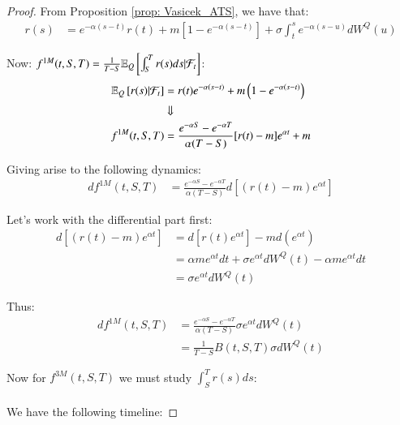 \begin{proof}

From Proposition \ref{prop: Vasicek_ATS}, we have that: 
\begin{align*}
r(s) &= e^{-\alpha(s-t)}r(t) + m[1-e^{-\alpha(s-t)}] + \sigma \int_{t}^{s}e^{-\alpha(s-u)}dW^{Q}(u)
\end{align*}

Now: $f^{1M}(t,S,T) = \frac{1}{T-S}\mathbb{E}_{Q}\left[\int_{S}^{T}r(s)ds|\mathcal{F}_{t} \right]$:  
\begin{align*}
\mathbb{E}_{Q}\left[
r(s)|\mathcal{F}_{t}
\right]
&= 
r(t)e^{-\alpha(s-t)} + m\left(1-e^{-\alpha(s-t)}\right) \\ 
&\Downarrow \\ 
f^{1M}(t,S,T)
&= 
\frac{e^{-\alpha S}- e^{-\alpha T}}{\alpha(T-S)}[r(t)-m]e^{\alpha t}
+ m 
\end{align*}

Giving arise to the following dynamics: 
\begin{align*}
df^{1M}(t,S,T) 
&= 
\frac{e^{-\alpha S}- e^{-\alpha T}}
{\alpha(T-S)}
d\left[
(r(t)-m)e^{\alpha t}
\right]
\end{align*}

Let's work with the differential part first: 
\begin{align*}
d[(r(t)-m)e^{\alpha t}] &= d[r(t)e^{\alpha t}] - md(e^{\alpha t}) \\
&= \alpha me^{\alpha t}dt + \sigma e^{\alpha t}dW^{Q}(t) - \alpha me^{\alpha t}dt \\ 
&= 
\sigma e^{\alpha t}dW^{Q}(t)
\end{align*}

Thus: 
\begin{align*}
df^{1M}(t,S,T) 
&= 
\frac{e^{-\alpha S}- e^{-\alpha T}}
{\alpha(T-S)}\sigma e^{\alpha t}dW^{Q}(t) \\ 
&= \frac{1}{T-S}B(t,S,T)\sigma dW^{Q}(t)
\end{align*}

\newpage 
Now for $f^{3M}(t,S,T)$ we must study $\int_{S}^{T}r(s)ds$:  
\\~\\
We have the following timeline:

\end{proof}
